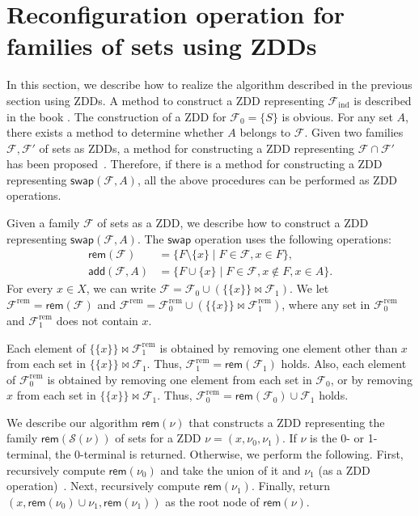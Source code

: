 \documentclass{article}
\begin{document}
\section{Reconfiguration operation for families of sets using ZDDs}

In this section, we describe how to realize the algorithm described in the previous section using ZDDs.
A method to construct a ZDD representing $\mathcal{F}_{\mathrm{ind}}$ is described in the book \cite{Knuth2011}.
The construction of a ZDD for $\mathcal{F}_0 =\{S\}$ is obvious.
For any set $A$, there exists a method to determine whether $A$ belongs to $\mathcal{F}$.
Given two families $\mathcal{F}, \mathcal{F}'$ of sets as ZDDs,
a method for constructing a ZDD representing $\mathcal{F} \cap \mathcal{F}'$ has been proposed~\cite{Minato93}.
Therefore, if there is a method for constructing a ZDD representing $\mathsf{swap}(\mathcal{F}, A)$,
all the above procedures can be performed as ZDD operations.

Given a family $\mathcal{F}$ of sets as a ZDD,
we describe how to construct a ZDD representing $\mathsf{swap}(\mathcal{F}, A)$.
The $\mathsf{swap}$ operation uses the following operations:
\begin{align*}
  \mathsf{rem}(\mathcal{F}) & =  \{ F \setminus \{x\}
  \mid F \in \mathcal{F}, x \in F \}, \\
  \mathsf{add}(\mathcal{F}, A) & = \{ F \cup \{x\} 
      \mid F \in \mathcal{F}, x \notin F, x \in A \}.
\end{align*}
For every $x \in X$,
we can write $\mathcal{F} = \mathcal{F}_0 \cup (\{\{x\}\} \Join \mathcal{F}_1)$.
We let $\mathcal{F}^{\mathrm{rem}} = \mathsf{rem}(\mathcal{F})$ and
$\mathcal{F}^{\mathrm{rem}} = \mathcal{F}_0^{\mathrm{rem}} \cup (\{\{x\}\} \Join \mathcal{F}_1^{\mathrm{rem}})$,
where any set in $\mathcal{F}_0^{\mathrm{rem}}$ and $\mathcal{F}_1^{\mathrm{rem}}$ does not contain $x$.

Each element of $\{\{x\}\} \Join \mathcal{F}_1^{\mathrm{rem}}$ is obtained by removing one element other than $x$
from each set in $\{\{x\}\} \Join \mathcal{F}_1$. Thus, $\mathcal{F}_1^{\mathrm{rem}} = \mathsf{rem}(\mathcal{F}_1)$ holds.
Also, each element of $\mathcal{F}_0^{\mathrm{rem}}$ is obtained by
removing one element from each set in $\mathcal{F}_0$, or by removing $x$ from each set in $\{\{x\}\} \Join \mathcal{F}_1$.
Thus, $\mathcal{F}_0^{\mathrm{rem}} = \mathsf{rem}(\mathcal{F}_0) \cup \mathcal{F}_1$ holds.


We describe our algorithm $\mathsf{rem}(\nu)$ that constructs a ZDD representing the family $\mathsf{rem}(\mathcal{S}(\nu))$ of sets
for a ZDD $\nu = (x, \nu_0, \nu_1)$.
If $\nu$ is the 0- or 1-terminal, the 0-terminal is returned. Otherwise, we perform the following.
First, recursively compute $\mathsf{rem}(\nu_0)$ and take the union of it and $\nu_1$ (as a ZDD operation)~\cite{Knuth2011}.
Next, recursively compute $\mathsf{rem}(\nu_1)$.
Finally, return $(x, \mathsf{rem}(\nu_0) \cup \nu_1, \mathsf{rem}(\nu_1))$ as the root node of $\mathsf{rem}(\nu)$.
\end{document}
